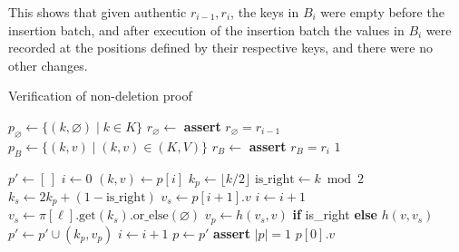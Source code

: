 \documentclass[twocolumn]{article}
\begin{document}
This shows that given authentic $r_{i-1}, r_i$, the keys in $B_i$ were empty before the insertion batch, and after execution of the insertion batch the values in $B_i$ were recorded at the positions defined by their respective keys, and there were no other changes.

\begin{algorithm}[tb]
  \caption{Verification of non-deletion proof}\label{alg:verifynondeletion}
  \begin{algorithmic}[0]
      \State   {}
      \State   {}
      \State $p_\varnothing \gets \{(k, \varnothing) \mid k \in K\}$ 
      \State $r_\varnothing \gets$ 
      \State \textbf{assert} $r_\varnothing = r_{i-1}$
      \State {}
      \State $p_B \gets \{(k, v) \mid (k,v) \in (K, V)\}$
      \State $r_B \gets$ 
      \State \textbf{assert} $r_B = r_i$
      \State \Return $1$ 
    \EndFunction

        \State $p' \gets [\,]$
        \State $i \gets 0$
          \State $(k, v) \gets p[i]$
          \State $k_p \gets \lfloor k / 2 \rfloor$ 
          \State $\text{is\_right} \gets k \bmod 2$
          \State $k_s \gets 2k_p + (1 - \text{is\_right})$ 
            \State $v_s \gets p[i+1].v$  
            \State $i \gets i + 1$       
          \Else                          {}
            \State                       {}
            \State $v_s \gets \pi[\ell].\text{get}(k_s).\text{or\_else}( \varnothing)$
          \EndIf
          \State $v_p \gets h(v_s, v)$ \textbf{if} is\_right \textbf{else} $h(v, v_s)$
          \State $p' \gets p' \cup (k_p, v_p)$
          \State $i \gets i + 1$
        \EndWhile
        \State $p \gets p'$
      \EndFor
      \State \textbf{assert} $|p| = 1$ 
      \State \Return $p[0].v$ 
    \EndFunction
  \end{algorithmic}
\end{algorithm}
\end{document}
